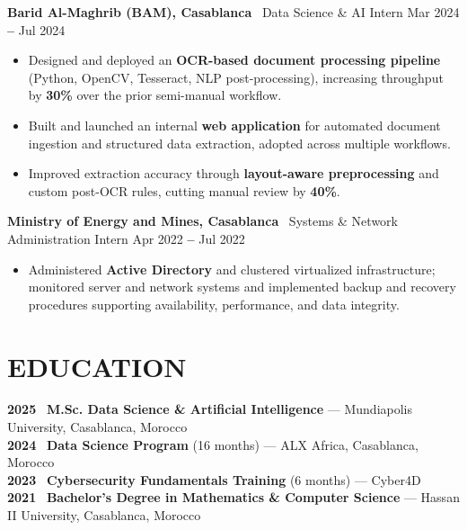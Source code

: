 \documentclass[10pt,a4paper]{article}
\newcommand{\role}[3]{%
  \vspace{1pt}\noindent\textbf{#1} \textbar\ #2 \hfill \textcolor{mutedgray}{\small #3}\par\vspace{-2pt}
}
\begin{document}
\role{Barid Al-Maghrib (BAM), Casablanca}{Data Science \& AI Intern}{Mar 2024 \textbf{--} Jul 2024}
\begin{itemize}
    \item Designed and deployed an \textbf{OCR-based document processing pipeline} (Python, OpenCV, Tesseract, NLP post-processing), increasing throughput by \textbf{30\%} over the prior semi-manual workflow.
    \item Built and launched an internal \textbf{web application} for automated document ingestion and structured data extraction, adopted across multiple workflows.
    \item Improved extraction accuracy through \textbf{layout-aware preprocessing} and custom post-OCR rules, cutting manual review by \textbf{40\%}.
\end{itemize}\vspace{-6pt}

\role{Ministry of Energy and Mines, Casablanca}{Systems \& Network Administration Intern}{Apr 2022 \textbf{--} Jul 2022}
\begin{itemize}
    \item Administered \textbf{Active Directory} and clustered virtualized infrastructure; monitored server and network systems and implemented backup and recovery procedures supporting availability, performance, and data integrity.
\end{itemize}

\section*{EDUCATION}
\small
\textbf{2025} \textbar\ \textbf{M.Sc. Data Science \& Artificial Intelligence} — Mundiapolis University, Casablanca, Morocco\\
\textbf{2024} \textbar\ \textbf{Data Science Program} (16 months) — ALX Africa, Casablanca, Morocco\\
\textbf{2023} \textbar\ \textbf{Cybersecurity Fundamentals Training} (6 months) — Cyber4D\\
\textbf{2021} \textbar\ \textbf{Bachelor's Degree in Mathematics \& Computer Science} — Hassan II University, Casablanca, Morocco
\end{document}
